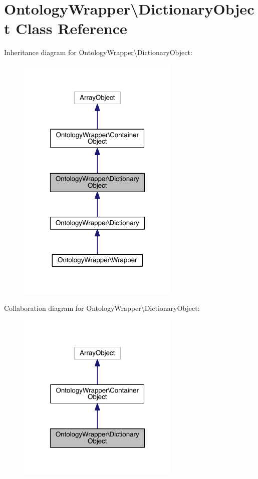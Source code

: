 \hypertarget{class_ontology_wrapper_1_1_dictionary_object}{\section{Ontology\-Wrapper\textbackslash{}Dictionary\-Object Class Reference}
\label{class_ontology_wrapper_1_1_dictionary_object}
}


Inheritance diagram for Ontology\-Wrapper\textbackslash{}Dictionary\-Object\-:
\nopagebreak
\begin{figure}[H]
\begin{center}
\leavevmode
\includegraphics[width=220pt]{class_ontology_wrapper_1_1_dictionary_object__inherit__graph}
\end{center}
\end{figure}


Collaboration diagram for Ontology\-Wrapper\textbackslash{}Dictionary\-Object\-:
\nopagebreak
\begin{figure}[H]
\begin{center}
\leavevmode
\includegraphics[width=220pt]{class_ontology_wrapper_1_1_dictionary_object__coll__graph}
\end{center}
\end{figure}
